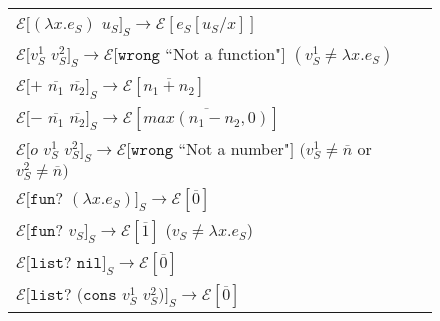 \begin{figure}[p]
\centering
\begin{tabular}{l}
\vspace{5pt}

$\mathscr{E}[(\lambda x.e_{S})$ $u_{S}]_{S}\rightarrow\mathscr{E}[e_{S}[u_{S}/x]]$ \\

\vspace{5pt}

$\mathscr{E}[v_{S}^{1}$ $v_{S}^{2}]_{S}\rightarrow\mathscr{E}[\mathtt{wrong}$ ``Not a function"$]$ $(v_{S}^{1}\neq\lambda x.e_{S})$ \\

\vspace{5pt}

$\mathscr{E}[+$ $\overline{n_{1}}$ $\overline{n_{2}}]_{S}\rightarrow\mathscr{E}[\overline{n_{1}+n_{2}}]$ \\

\vspace{5pt}

$\mathscr{E}[-$ $\overline{n_{1}}$ $\overline{n_{2}}]_{S}\rightarrow\mathscr{E}[\overline{max(n_{1}-n_{2},0)}]$ \\

\vspace{5pt}

$\mathscr{E}[o$ $v_{S}^{1}$ $v_{S}^{2}]_{S}\rightarrow\mathscr{E}[\mathtt{wrong}$ ``Not a number"$]$ $(v_{S}^{1}\neq\overline{n}$ or $v_{S}^{2}\neq\overline{n})$ \\

\vspace{5pt}

$\mathscr{E}[\mathtt{fun?}$ $(\lambda x.e_{S})]_{S}\rightarrow\mathscr{E}[\overline{0}]$ \\

\vspace{5pt}

$\mathscr{E}[\mathtt{fun?}$ $v_{S}]_{S}\rightarrow\mathscr{E}[\overline{1}]$ ($v_{S}\neq\lambda x.e_{S}$) \\

\vspace{5pt}

$\mathscr{E}[\mathtt{list?}$ $\mathtt{nil}]_{S}\rightarrow\mathscr{E}[\overline{0}]$ \\

\vspace{5pt}

$\mathscr{E}[\mathtt{list?}$ $(\mathtt{cons}$ $v_{S}^{1}$ $v_{S}^{2})]_{S}\rightarrow\mathscr{E}[\overline{0}]$ \\


\end{tabular}
\end{figure}
